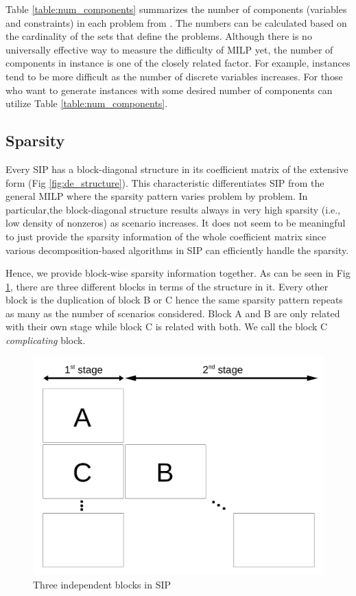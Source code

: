 Table \ref{table:num_components} summarizes the number of components (variables and constraints) in each problem from \siplibtwo. The numbers can be calculated based on the cardinality of the sets that define the problems. Although there is no universally effective way to measure the difficulty of MILP yet, the number of components in instance is one of the closely related factor. For example, instances tend to be more difficult as the number of discrete variables increases. For those who want to generate instances with some desired number of components can utilize Table \ref{table:num_components}.



\subsection{Sparsity}
Every SIP has a block-diagonal structure in its coefficient matrix of the extensive form (Fig \ref{fig:de_structure}). This characteristic differentiates SIP from the general MILP where the sparsity pattern varies problem by problem. In particular,the block-diagonal structure results always in very high sparsity (i.e., low density of nonzeros) as scenario increases. It does not seem to be meaningful to just provide the sparsity information of the whole coefficient matrix since various decomposition-based algorithms in SIP can efficiently handle the sparsity. 

Hence, we provide block-wise sparsity information together. As can be seen in Fig \ref{fig:stagewise_sparsity}, there are three different blocks in terms of the structure in it. Every other block is the duplication of block B or C hence the same sparsity pattern repeats as many as the number of scenarios considered. Block A and B are only related with their own stage while block C is related with both. We call the block C \textit{complicating} block. 



\begin{figure}
	\centering
	\includegraphics[width=0.7\linewidth]{drawings/stagewise_sparsity}
	\caption{Three independent blocks in SIP}
	\label{fig:stagewise_sparsity}
\end{figure}







